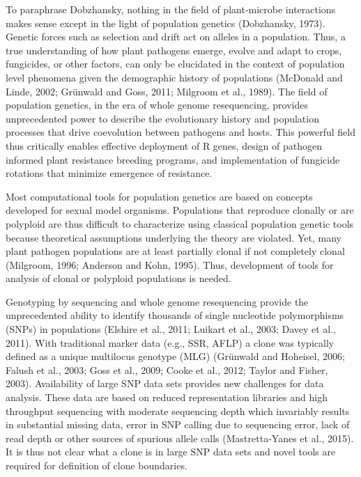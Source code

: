 \documentclass{frontiersSCNS} %
\begin{document}
To paraphrase Dobzhansky, nothing in the field of plant-microbe
interactions makes sense except in the light of population genetics
(Dobzhansky, 1973). Genetic forces such as selection and drift act on
alleles in a population. Thus, a true understanding of how plant
pathogens emerge, evolve and adapt to crops, fungicides, or other
factors, can only be elucidated in the context of population level
phenomena given the demographic history of populations (McDonald and
Linde, 2002; Gr\"{u}nwald and Goss, 2011; Milgroom et al., 1989). The field
of population genetics, in the era of whole genome resequencing,
provides unprecedented power to describe the evolutionary history and
population processes that drive coevolution between pathogens and hosts.
This powerful field thus critically enables effective deployment of R
genes, design of pathogen informed plant resistance breeding programs,
and implementation of fungicide rotations that minimize emergence of
resistance.

Most computational tools for population genetics are based on concepts
developed for sexual model organisms. Populations that reproduce
clonally or are polyploid are thus difficult to characterize using
classical population genetic tools because theoretical assumptions
underlying the theory are violated. Yet, many plant pathogen populations
are at least partially clonal if not completely clonal (Milgroom, 1996;
Anderson and Kohn, 1995). Thus, development of tools for analysis of
clonal or polyploid populations is needed.

Genotyping by sequencing and whole genome resequencing provide the
unprecedented ability to identify thousands of single nucleotide
polymorphisms (SNPs) in populations (Elshire et al., 2011; Luikart et
al., 2003; Davey et al., 2011). With traditional marker data (e.g., SSR,
AFLP) a clone was typically defined as a unique multilocus genotype
(MLG) (Gr{\"{u}}nwald and Hoheisel, 2006; Falush et al., 2003; Goss et al.,
2009; Cooke et al., 2012; Taylor and Fisher, 2003). Availability of
large SNP data sets provides new challenges for data analysis. These
data are based on reduced representation libraries and high throughput
sequencing with moderate sequencing depth which invariably results in
substantial missing data, error in SNP calling due to sequencing error,
lack of read depth or other sources of spurious allele calls
(Mastretta-Yanes et al., 2015). It is thus not clear what a clone is in
large SNP data sets and novel tools are required for definition of clone
boundaries.
\end{document}
